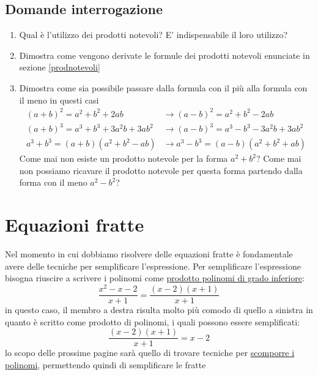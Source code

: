 \subsection{Domande interrogazione}
\begin{enumerate}
	\item Qual è l'utilizzo dei prodotti notevoli? E' indispensabile il loro utilizzo?
	\item Dimostra come vengono derivate le formule dei prodotti notevoli enunciate in sezione \ref{prodnotevoli}
	\item Dimostra come sia possibile passare dalla formula con il più alla formula con il meno in questi casi
	      \begin{align*}
		      \left(a+b\right)^2 = a^2  + b^2 + 2ab                      & \rightarrow \left(a-b\right)^2 =a^2  + b^2 - 2ab                      \\
		      \left(a + b\right)^3 = a^3  + b^3 +3a^2 b + 3 a b^2        & \rightarrow \left(a - b\right)^3 = a^3  - b^3 -3a^2 b + 3 a b^2       \\
		      a^3  + b^3 = \left(a+b\right)\left(a^2  + b^2  - ab\right) & \rightarrow a^3  - b^3 =  \left(a-b\right)\left(a^2  + b^2 +ab\right)
	      \end{align*}
	      Come mai non esiste un prodotto notevole per la forma $ a^2  + b^2  $? Come mai non possiamo ricavare il prodotto notevole per questa forma partendo dalla forma con il meno $ a^2  - b^2  $?
\end{enumerate}

\section{Equazioni fratte}
Nel momento in cui dobbiamo risolvere delle equazioni fratte è fondamentale avere delle tecniche per semplificare l'espressione. Per semplificare l'espressione bisogna riuscire a scrivere i polinomi come \underline{prodotto polinomi di grado inferiore}:
\[
	\frac{x^2 -x - 2}{x+1} = \frac{\left(x-2\right)\left(x+1\right)}{x+1}
\]
in questo caso, il membro a destra risulta molto più comodo di quello a sinistra in quanto è scritto come prodotto di polinomi, i quali possono essere semplificati:
\[
	\frac{\left(x-2\right)\left(x+1\right)}{x+1} = x-2
\]
lo scopo delle prossime pagine sarà quello di trovare tecniche per \underline{scomporre i polinomi}, permettendo quindi di semplificare le fratte
